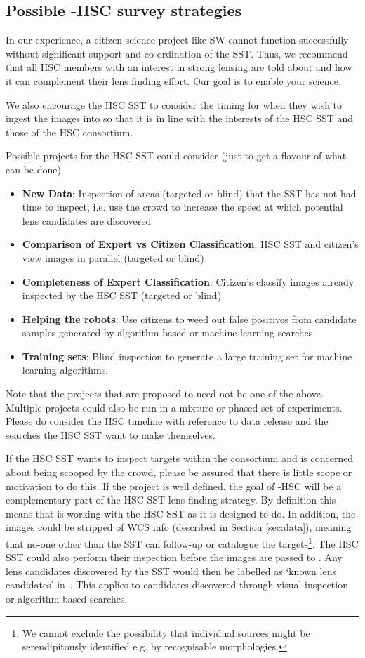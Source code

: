 \documentclass[a4paper,twocolumn]{article}
\begin{document}
\subsection{Possible \SW-HSC survey strategies}

In our experience, a citizen science project like SW cannot function
successfully without significant support and co-ordination of the
SST. Thus, we recommend that all HSC members with an interest in
strong lensing are told about \SW and how it can complement their lens
finding effort. Our goal is to enable your science.

We also encourage the HSC SST to consider the timing for when they
wish to ingest the images into \SW so that it is in line with the
interests of the HSC SST and those of the HSC consortium.

Possible projects for the HSC SST could consider (just to get a flavour of what can be done)
\begin{itemize}
\item \textbf{New Data}: Inspection of areas (targeted or blind) that the SST has not had time to inspect, i.e. use the crowd to increase the speed at which potential lens candidates are discovered
\item \textbf{Comparison of Expert vs Citizen Classification}: HSC SST and citizen's view images in parallel (targeted or blind)
\item \textbf{Completeness of Expert Classification}: Citizen's classify images already inspected by the HSC SST (targeted or blind)
\item \textbf{Helping the robots}: Use citizens to weed out false positives from candidate samples generated by algorithm-based or machine learning searches
\item \textbf{Training sets}: Blind inspection to generate a large training set for machine learning algorithms.
\end{itemize}

Note that the projects that are proposed to \SW need not be one of the
above. Multiple projects could also be  run in a mixture or phased set
of experiments. Please do consider the HSC timeline with reference to
data release and the searches the HSC SST want to make themselves.

If the HSC SST wants to inspect targets within the consortium and is
concerned about being scooped by the crowd, please be assured that
there is little scope or motivation to do this. If the project is well
defined, the goal of \SW-HSC will be a complementary part of the HSC
SST lens finding strategy. By definition this means that \SW is
working with the HSC SST as it is designed to do. In addition, the
images could be stripped of WCS info (described in Section
\ref{sec:data}), meaning that no-one other than the SST can follow-up
or catalogue the targets\footnote{We cannot exclude the possibility
  that individual sources might be serendipitously identified e.g. by
  recognisable morphologies.}.  The HSC SST could also perform their
inspection before the images are passed to \SW. Any lens candidates
discovered by the SST would then be labelled as `known lens
candidates' in \sw\,\Talk. This applies to candidates discovered
through visual inspection or algorithm based searches.
\end{document}
